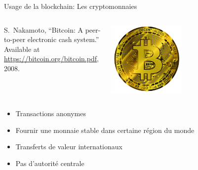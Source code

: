 \documentclass{beamer}
\begin{document}
\begin{frame}{Usage de la blockchain: Les cryptomonnaies}
\begin{columns}
\begin{column}{0.5\textwidth}
   
{\footnotesize
\begin{thebibliography}{1}
S.~Nakamoto, ``Bitcoin: A peer-to-peer electronic cash system.'' Available at
  \href{https://bitcoin.org/bitcoin.pdf}{https://bitcoin.org/bitcoin.pdf},
  2008.
\end{thebibliography}  
}
\end{column}
\begin{column}{0.5\textwidth}  %
    \begin{center}
     \includegraphics[width=0.5\textwidth]{../../Figures/bitcoin-6284869_1920.png}
     \end{center}
\end{column}
\end{columns}

\begin{itemize}
  \item Transactions anonymes
  \item Fournir une monnaie stable dans certaine région du monde
  \item Transferts de valeur internationaux 
  \item Pas d'autorité centrale
\end{itemize}
\end{frame}
\end{document}
